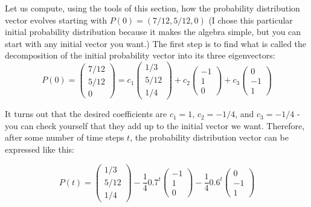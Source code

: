 \documentclass[
  letterpaper,
  DIV=11,
  numbers=noendperiod]{scrreprt}
\begin{document}
Let us compute, using the tools of this section, how the probability
distribution vector evolves starting with \(P(0) = (7/12,5/12,0)\) (I
chose this particular initial probability distribution because it makes
the algebra simple, but you can start with any initial vector you want.)
The first step is to find what is called the decomposition of the
initial probability vector into its three eigenvectors:
\[P(0)= \left(\begin{array}{c} 7/12 \\ 5/12  \\ 0 \end{array}\right) =  c_1\left(\begin{array}{c} 1/3     \\  5/12  \\ 1/4 \end{array}\right) + c_2 \left(\begin{array}{c} -1   \\ 1  \\ 0 \end{array}\right) + c_3\left(\begin{array}{c} 0  \\ -1  \\ 1 \end{array}\right)\]

It turns out that the desired coefficients are \(c_1 = 1\),
\(c_2 = -1/4\), and \(c_3 = -1/4\) - you can check yourself that they
add up to the initial vector we want. Therefore, after some number of
time steps \(t\), the probability distribution vector can be expressed
like this:

\[ P(t) = \left(\begin{array}{c} 1/3     \\  5/12  \\ 1/4 \end{array}\right) -\frac{1}{4} 0.7^t \left(\begin{array}{c} -1   \\ 1  \\ 0 \end{array}\right)  -\frac{1}{4} 0.6^t \left(\begin{array}{c} 0  \\ -1  \\ 1 \end{array}\right)\]
\end{document}
